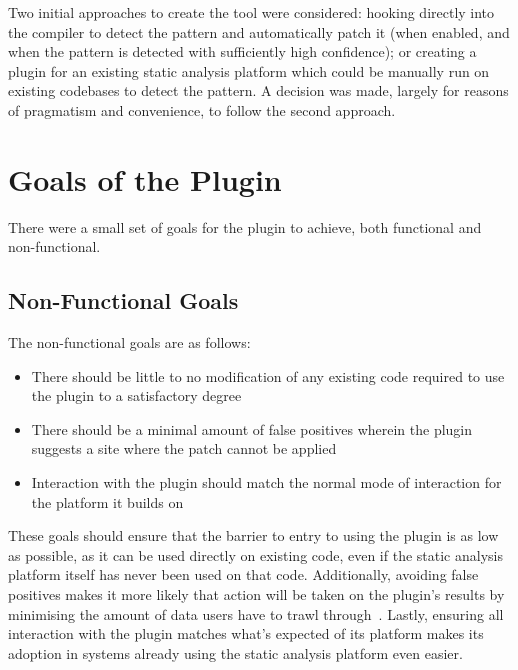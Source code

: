 Two initial approaches to create the tool were considered: hooking directly into the compiler to detect the pattern and automatically patch it (when enabled, and when the pattern is detected with sufficiently high confidence); or creating a plugin for an existing static analysis platform which could be manually run on existing codebases to detect the pattern. A decision was made, largely for reasons of pragmatism and convenience, to follow the second approach.


\section{Goals of the Plugin}


There were a small set of goals for the plugin to achieve, both functional and non-functional.

\subsection{Non-Functional Goals}

The non-functional goals are as follows:

\begin{itemize}
	\item There should be little to no modification of any existing code required to use the plugin to a satisfactory degree
	\item There should be a minimal amount of false positives wherein the plugin suggests a site where the patch cannot be applied
	\item Interaction with the plugin should match the normal mode of interaction for the platform it builds on
\end{itemize}

These goals should ensure that the barrier to entry to using the plugin is as low as possible, as it can be used directly on existing code, even if the static analysis platform itself has never been used on that code. Additionally, avoiding false positives makes it more likely that action will be taken on the plugin's results by minimising the amount of data users have to trawl through~\cite{infervideo}. Lastly, ensuring all interaction with the plugin matches what's expected of its platform makes its adoption in systems already using the static analysis platform even easier.

